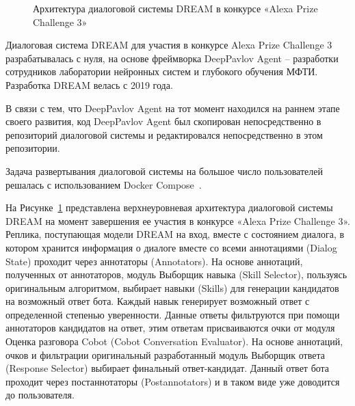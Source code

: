 \begin{figure}[ht]
  \caption{Архитектура диалоговой системы {DREAM} в конкурсе «Alexa Prize Challenge 3»}\label{fig:Alexa1}
\end{figure}


Диалоговая система {DREAM} для участия в конкурсе Alexa Prize Challenge 3 разрабатывалась с нуля, на основе фреймворка DeepPavlov Agent --  разработки сотрудников лаборатории нейронных систем и глубокого обучения МФТИ. Разработка {DREAM} велась с 2019 года.

В связи с тем, что DeepPavlov Agent на тот момент находился на раннем этапе своего развития, код DeepPavlov Agent был скопирован непосредственно в репозиторий диалоговой системы и редактировался непосредственно в этом репозитории.

Задача развертывания диалоговой системы на большое число пользователей решалась с использованием Docker Compose~\cite{na_website_ndk}.

На Рисунке~\ref{fig:Alexa1} представлена верхнеуровневая архитектура диалоговой системы {DREAM} на момент завершения ее участия в конкурсе «Alexa Prize Challenge 3». Реплика, поступающая модели {DREAM} на вход, вместе с состоянием диалога, в котором хранится информация о диалоге вместе со всеми аннотациями (Dialog State) проходит через аннотаторы (Annotators). На основе аннотаций, полученных от аннотаторов, модуль Выборщик навыка (Skill Selector), пользуясь оригинальным алгоритмом, выбирает навыки (Skills) для генерации кандидатов на возможный ответ бота. Каждый навык генерирует возможный ответ с определенной степенью уверенности. Данные ответы фильтруются при помощи аннотаторов кандидатов на ответ, этим ответам присваиваются очки от модуля Оценка разговора Cobot (Cobot Conversation Evaluator). На основе аннотаций, очков и фильтрации оригинальный разработанный модуль Выборщик ответа (Response Selector) выбирает финальный ответ-кандидат. Данный ответ бота проходит через постаннотаторы (Postannotators) и в таком виде уже доводится до пользователя.

